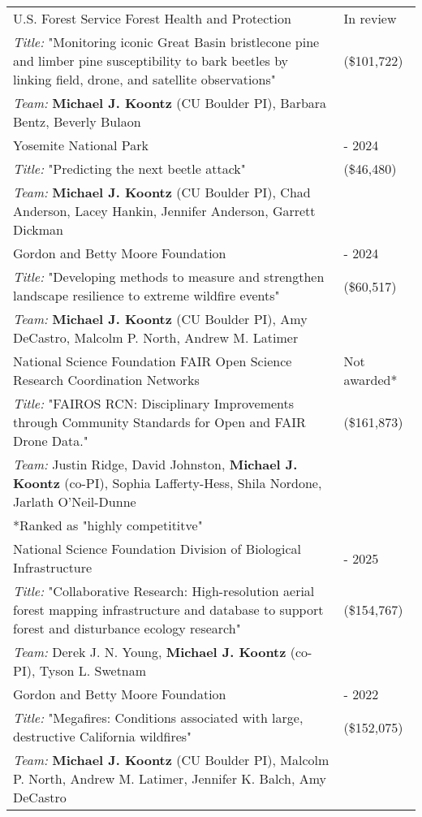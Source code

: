 \begin{longtable}{@{}>{\raggedright}p{5.25in} @{} >{\raggedleft}X@{}}

U.S. Forest Service Forest Health and Protection & In review \tabularnewline
\addtolength{\leftskip}{5ex}\emph{Title:} "Monitoring iconic Great Basin bristlecone pine and limber pine susceptibility to bark beetles by linking field, drone, and satellite observations" & (\$101,722) \tabularnewline
\addtolength{\leftskip}{5ex}\emph{Team:} \textbf{Michael J. Koontz} (CU Boulder PI), Barbara Bentz, Beverly Bulaon & \tabularnewline

Yosemite National Park & 2023 - 2024 \tabularnewline
\addtolength{\leftskip}{5ex}\emph{Title:} "Predicting the next beetle attack" & (\$46,480) \tabularnewline
\addtolength{\leftskip}{5ex}\emph{Team:} \textbf{Michael J. Koontz} (CU Boulder PI), Chad Anderson, Lacey Hankin, Jennifer Anderson, Garrett Dickman & \tabularnewline

Gordon and Betty Moore Foundation & 2023 - 2024 \tabularnewline
\addtolength{\leftskip}{5ex}\emph{Title:} "Developing methods to measure and strengthen landscape resilience to extreme wildfire events" & (\$60,517) \tabularnewline
\addtolength{\leftskip}{5ex}\emph{Team:} \textbf{Michael J. Koontz} (CU Boulder PI), Amy DeCastro, Malcolm P. North, Andrew M. Latimer & \tabularnewline

National Science Foundation FAIR Open Science Research Coordination Networks & Not awarded* \tabularnewline
\addtolength{\leftskip}{5ex}\emph{Title:} "FAIROS RCN: Disciplinary Improvements through Community Standards for Open and FAIR Drone Data." & (\$161,873) \tabularnewline
\addtolength{\leftskip}{5ex}\emph{Team:} Justin Ridge, David Johnston, \textbf{Michael J. Koontz} (co-PI), Sophia Lafferty-Hess, Shila Nordone, Jarlath O'Neil-Dunne \tabularnewline
\addtolength{\leftskip}{5ex} *Ranked as "highly competititve" & \tabularnewline

National Science Foundation Division of Biological Infrastructure & 2022 - 2025 \tabularnewline
\addtolength{\leftskip}{5ex}\emph{Title:} "Collaborative Research: High-resolution aerial forest mapping infrastructure and database to support forest and disturbance ecology research" & (\$154,767) \tabularnewline
\addtolength{\leftskip}{5ex}\emph{Team:} Derek J. N. Young, \textbf{Michael J. Koontz} (co-PI), Tyson L. Swetnam & \tabularnewline

Gordon and Betty Moore Foundation & 2020 - 2022 \tabularnewline
\addtolength{\leftskip}{5ex}\emph{Title:} "Megafires: Conditions associated with large, destructive California wildfires" & (\$152,075) \tabularnewline
\addtolength{\leftskip}{5ex}\emph{Team:} \textbf{Michael J. Koontz} (CU Boulder PI), Malcolm P. North, Andrew M. Latimer, Jennifer K. Balch, Amy DeCastro & \tabularnewline


\end{longtable}

